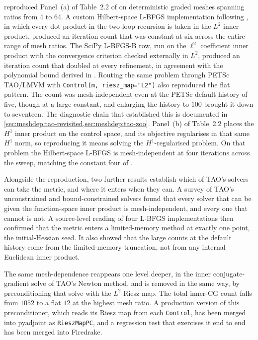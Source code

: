 \documentclass[a4paper,11pt]{article}
\theoremstyle{spacedplain} \newtheorem{theorem}[counter]{Theorem} \newtheorem{lemma}[counter]{Lemma} \newtheorem{prop}[counter]{Proposition} \newtheorem{cor}[counter]{Corollary}
\theoremstyle{spaceddefinition} \newtheorem{defn}[counter]{Definition} \newtheorem{example}[counter]{Example} \newtheorem{remark}[counter]{Remark}
\begin{document}
 reproduced Panel~(a) of Table~2.2 of \citet{shfp2017} on deterministic graded meshes spanning ratios from $4$ to $64$. A custom Hilbert-space L-BFGS implementation following \citet[Sect.~1.5.4.1]{shfp2017}, in which every dot product in the two-loop recursion is taken in the $L^{2}$ inner product, produced an iteration count that was constant at six across the entire range of mesh ratios. The SciPy L-BFGS-B row, run on the $\ell^{2}$ coefficient inner product with the convergence criterion checked externally in $L^{2}$, produced an iteration count that doubled at every refinement, in agreement with the polynomial bound derived in \citet[Sect.~2.2.4]{shfp2017}. Routing the same problem through PETSc TAO/LMVM with \texttt{Control(m, riesz\_map="L2")} also reproduced the flat pattern. The count was mesh-independent even at the PETSc default history of five, though at a large constant, and enlarging the history to $100$ brought it down to seventeen. The diagnostic chain that established this is documented in \cref{sec:meshdep:tao-revisited,sec:meshdep:tao-zoo}. Panel~(b) of Table~2.2 places the $H^{1}$ inner product on the control space, and its objective regularises in that same $H^{1}$ norm, so reproducing it means solving the $H^{1}$-regularised problem. On that problem the Hilbert-space L-BFGS is mesh-independent at four iterations across the sweep, matching the constant four of \citet{shfp2017}.

Alongside the reproduction, two further results establish which of TAO's solvers can take the metric, and where it enters when they can. A survey of TAO's unconstrained and bound-constrained solvers found that every solver that can be given the function-space inner product is mesh-independent, and every one that cannot is not. A source-level reading of four L-BFGS implementations then confirmed that the metric enters a limited-memory method at exactly one point, the initial-Hessian seed. It also showed that the large counts at the default history come from the limited-memory truncation, not from any internal Euclidean inner product.

The same mesh-dependence reappears one level deeper, in the inner conjugate-gradient solve of TAO's Newton method, and is removed in the same way, by preconditioning that solve with the $L^{2}$ Riesz map. The total inner-CG count falls from $1052$ to a flat $12$ at the highest mesh ratio. A production version of this preconditioner, which reads its Riesz map from each \texttt{Control}, has been merged into pyadjoint as \texttt{RieszMapPC}, and a regression test that exercises it end to end has been merged into Firedrake.
\end{document}
